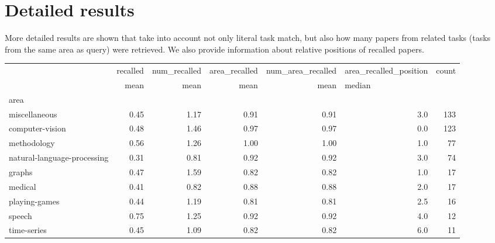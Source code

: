 \documentclass[11pt]{report}
\begin{document}
\section{Detailed results}

More detailed results are shown that take into account not only literal task match, but also how many papers from related tasks (tasks from the same area as query) were retrieved. We also provide information about relative positions of recalled papers.

\begin{center}
\begin{tabular}{p{1cm}rrrrrr}
\toprule
{} & recalled & num\_recalled & area\_recalled & num\_area\_recalled & area\_recalled\_position & count \\
{} &     mean &         mean &          mean &              mean & \multicolumn{2}{l}{median} \\
area                        &          &              &               &                   &                        &       \\
\midrule
miscellaneous               &     0.45 &         1.17 &          0.91 &              0.91 &                    3.0 &   133 \\
computer-vision             &     0.48 &         1.46 &          0.97 &              0.97 &                    0.0 &   123 \\
methodology                 &     0.56 &         1.26 &          1.00 &              1.00 &                    1.0 &    77 \\
natural-language-processing &     0.31 &         0.81 &          0.92 &              0.92 &                    3.0 &    74 \\
graphs                      &     0.47 &         1.59 &          0.82 &              0.82 &                    1.0 &    17 \\
medical                     &     0.41 &         0.82 &          0.88 &              0.88 &                    2.0 &    17 \\
playing-games               &     0.44 &         1.19 &          0.81 &              0.81 &                    2.5 &    16 \\
speech                      &     0.75 &         1.25 &          0.92 &              0.92 &                    4.0 &    12 \\
time-series                 &     0.45 &         1.09 &          0.82 &              0.82 &                    6.0 &    11 \\

\end{tabular}
\end{center}
\end{document}
